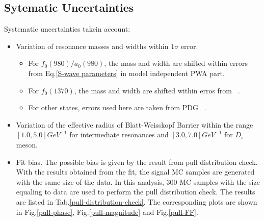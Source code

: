 \subsection{Sytematic Uncertainties}
\par{
    Systematic uncertainties takein account:
    \begin{itemize}
        \item \uppercase\expandafter{} Variation of resonance masses and widths within $1\sigma$ error.
            \begin{itemize}
                \item For $f_{0}(980) /a_{0}(980)$, the mass and width are shifted within errors from Eq.\ref{S-wave parameters} in model independent PWA part.
                \item For $f_{0}(1370)$, the mass and width are shifted within erros from ~\cite{para-f01370}.
                \item For other states, errors used here are taken from PDG ~\cite{PDG2018}.
            \end{itemize}
        \item \uppercase\expandafter{} Variation of the effective radius of Blatt-Weisskopf Barrier within the range $\left[1.0, 5.0\right] GeV^{-1}$ for intermediate resonances and  $\left[3.0, 7.0\right] GeV^{-1}$ for $D_{s}$ meson. 
        \item \uppercase\expandafter{} Fit bias. The possible bias is given by the result from pull distribution check. 
            With the results obtained from the fit, the signal MC samples are generated with the same size of the data. In this analysis, 300 MC samples with the size equaling to data are used to perform the pull distribution check.
            The results are listed in Tab.\ref{pull-distribution-check}.
            The corresponding plots are shown in Fig.\ref{pull-phase}, Fig.\ref{pull-magnitude} and Fig.\ref{pull-FF}.
    \end{itemize}
    
}

